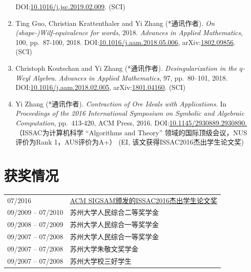\documentclass[a4paper,12pt]{article}
\newcommand{\red}{\color{red}}
\begin{document}
\begin{CJK*}{UTF8}{gbsn}
\begin{enumerate}
 DOI:\href{https://doi.org/10.1016/j.jsc.2019.02.009}{10.1016/j.jsc.2019.02.009}. (SCI)
\item Ting Guo, Christian Krattenthaler and Yi Zhang (*通讯作者).
{\em On (shape-)Wilf-equivalence for words}, 2018.
{\em  Advances in Applied Mathematics}, 100, pp.\ 87-100, 2018. 
DOI:\href{https://doi.org/10.1016/j.aam.2018.05.006}{10.1016/j.aam.2018.05.006}, 
arXiv:\href{https://arxiv.org/pdf/1802.09856.pdf}{1802.09856}. (SCI)
\item Christoph Koutschan and Yi Zhang (*通讯作者). {\em Desingularization in the $q$-Weyl Algebra}. 
{\em Advances in Applied Mathematics}, 97, pp.\ 80–101, 2018. \\
DOI:\href{http://dx.doi.org/10.1016/j.aam.2018.02.005}{10.1016/j.aam.2018.02.005},
arXiv:\href{https://arxiv.org/abs/1801.04160}{1801.04160}. (SCI) 
\item Yi Zhang (*通讯作者). {\em Contraction of Ore Ideals with Applications}. 
In {\em Proceedings of the 2016 International Symposium on Symbolic and Algebraic Computation}, 
pp.\ 413-420, ACM Press, 2016. DOI:\href{http://dl.acm.org/citation.cfm?id=2930890}{10.1145/2930889.2930890.} 
{\red （ISSAC为计算机科学 
“Algorithms and Theory”
领域的国际顶级会议，NUS评价为Rank 1，AUS评价为A+） (EI, 该文获得ISSAC2016杰出学生论文奖)} 
\end{enumerate}

\section*{\Large{获奖情况}}
\begin{tabular}{@{}p{1.4in}p{4in}}
07/2016               & \href{https://www.sigsam.org/Awards/ISSACAwards.html}{ACM SIGSAM颁发的ISSAC2016杰出学生论文奖} \\
09/2009 -- 07/2010    & 苏州大学人民综合二等奖学金\\
09/2008 -- 07/2009    & 苏州大学人民综合一等奖学金 \\
09/2007 -- 07/2008    & 苏州大学人民综合一等奖学金 \\ 
09/2007 -- 07/2008    & 苏州大学朱敬文奖学金 \\
09/2007 -- 07/2008    & 苏州大学校三好学生
\end{tabular}


\end{CJK*}
\end{document}
